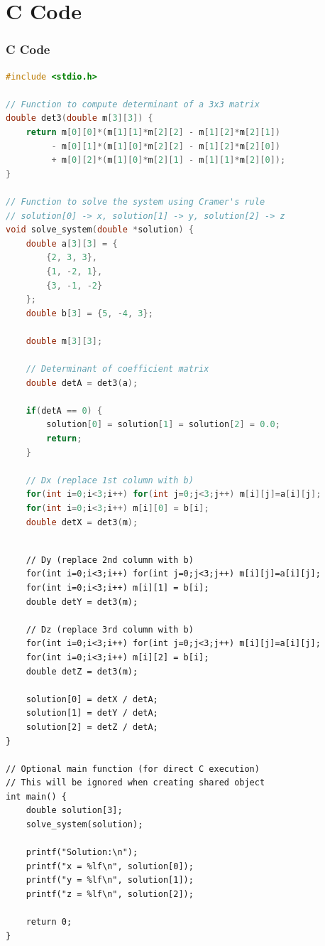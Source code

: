 \documentclass{beamer}
\numberwithin{equation}{section}
\theoremstyle{remark}
\begin{document}
\section{C Code}
\begin{frame}[fragile]
\frametitle{C Code }
\begin{lstlisting}[language=C]  
#include <stdio.h>

// Function to compute determinant of a 3x3 matrix
double det3(double m[3][3]) {
    return m[0][0]*(m[1][1]*m[2][2] - m[1][2]*m[2][1])
         - m[0][1]*(m[1][0]*m[2][2] - m[1][2]*m[2][0])
         + m[0][2]*(m[1][0]*m[2][1] - m[1][1]*m[2][0]);
}

// Function to solve the system using Cramer's rule
// solution[0] -> x, solution[1] -> y, solution[2] -> z
void solve_system(double *solution) {
    double a[3][3] = {
        {2, 3, 3},
        {1, -2, 1},
        {3, -1, -2}
    };
    double b[3] = {5, -4, 3};

    double m[3][3];

    // Determinant of coefficient matrix
    double detA = det3(a);

    if(detA == 0) {
        solution[0] = solution[1] = solution[2] = 0.0;
        return;
    }

    // Dx (replace 1st column with b)
    for(int i=0;i<3;i++) for(int j=0;j<3;j++) m[i][j]=a[i][j];
    for(int i=0;i<3;i++) m[i][0] = b[i];
    double detX = det3(m);
    \end{lstlisting}
    \end{frame}
    \begin{frame}[fragile]
    \begin{lstlisting}

    // Dy (replace 2nd column with b)
    for(int i=0;i<3;i++) for(int j=0;j<3;j++) m[i][j]=a[i][j];
    for(int i=0;i<3;i++) m[i][1] = b[i];
    double detY = det3(m);

    // Dz (replace 3rd column with b)
    for(int i=0;i<3;i++) for(int j=0;j<3;j++) m[i][j]=a[i][j];
    for(int i=0;i<3;i++) m[i][2] = b[i];
    double detZ = det3(m);

    solution[0] = detX / detA;
    solution[1] = detY / detA;
    solution[2] = detZ / detA;
}

// Optional main function (for direct C execution)
// This will be ignored when creating shared object
int main() {
    double solution[3];
    solve_system(solution);

    printf("Solution:\n");
    printf("x = %lf\n", solution[0]);
    printf("y = %lf\n", solution[1]);
    printf("z = %lf\n", solution[2]);

    return 0;
}

\end{lstlisting}
\end{frame}
\end{document}
